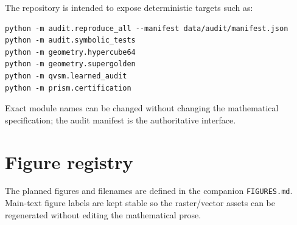 \documentclass[11pt,a4paper]{article}
\numberwithin{equation}{section}
\begin{document}
The repository is intended to expose deterministic targets such as:
\begin{verbatim}
python -m audit.reproduce_all --manifest data/audit/manifest.json
python -m audit.symbolic_tests
python -m geometry.hypercube64
python -m geometry.supergolden
python -m qvsm.learned_audit
python -m prism.certification
\end{verbatim}
Exact module names can be changed without changing the mathematical specification; the audit manifest is the authoritative interface.

\section{Figure registry}
\label{app:figregistry}

The planned figures and filenames are defined in the companion \texttt{FIGURES.md}. Main-text figure labels are kept stable so the raster/vector assets can be regenerated without editing the mathematical prose.



\end{document}
